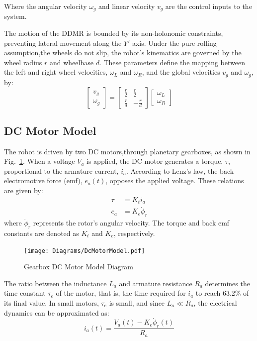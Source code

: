     Where the angular velocity $\omega_g$ and linear velocity $v_g$ are the control 
    inputs to the system. 

    The motion of the DDMR is bounded by its non-holonomic constraints, 
    preventing lateral movement along the $Y'$ axis. 
    Under the pure rolling assumption,the wheels do not slip, the robot's kinematics 
    are governed by the wheel radius $r$ and wheelbase $d$. These parameters define 
    the mapping between the left and right wheel velocities, $\omega_L$ and $\omega_R$, 
    and the global velocities $v_g$ and $\omega_g$, by:
    \begin{equation}
        \begin{bmatrix}
            v_g \\
            \omega_g
        \end{bmatrix}
        =
        \begin{bmatrix}
            \frac{r}{2} & \frac{r}{2} \\
            \frac{r}{d} & -\frac{r}{d}
        \end{bmatrix}
        \begin{bmatrix}
            \omega_L \\
            \omega_R
        \end{bmatrix}
        \label{eq:DDMR}
    \end{equation}

    
    \subsection{DC Motor Model}    
    The robot is driven by two DC motors,through planetary gearboxes, as shown in Fig.~\ref{fig:DCMotor}.
    When a voltage $V_a$ is applied, the DC motor generates a torque, $\tau$, 
    proportional to the armature current, $i_a$.
    According to Lenz's law, the back electromotive force (emf), $e_a(t)$, 
    opposes the applied voltage. These relations are given by:
    \begin{subequations}
        \begin{align}
            \tau &= K_t i_a \\
            e_a &= K_e \dot{\phi}_r
        \end{align}
    \end{subequations}
    where $\dot{\phi}_r$ represents the rotor's angular velocity. The torque 
    and back emf constants are denoted as $K_t$ and $K_e$, respectively.
    \begin{figure}[H]
        \centering
            \texttt{[image: Diagrams/DcMotorModel.pdf]}
        \caption{Gearbox DC Motor Model Diagram}
        \label{fig:DCMotor}
    \end{figure}
    The ratio between the inductance $L_a$ and armature resistance $R_a$ 
    determines the time constant $\tau_e$ of the motor, that is, the time required 
    for $i_a$ to reach 63.2\% of its final value. In small motors, $\tau_e$ is 
    small, and since $L_a \ll R_a$, the electrical dynamics can be approximated as:
    \begin{equation}
        i_a (t) = \frac{V_a (t) - K_e \dot{\phi}_r (t)}{R_a}
    \end{equation}

